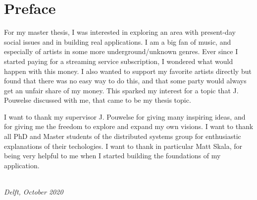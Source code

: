 \chapter*{Preface}

For my master thesis, I was interested in exploring an area with present-day social issues and in building real applications. I am a big fan of music, and especially of artists in some more underground/unknown genres. Ever since I started paying for a streaming service subscription, I wondered what would happen with this money. I also wanted to support my favorite artists directly but found that there was no easy way to do this, and that some party would always get an unfair share of my money. This sparked my interest for a topic that J. Pouwelse discussed with me, that came to be my thesis topic.

I want to thank my supervisor J. Pouwelse for giving many inspiring ideas, and for giving me the freedom to explore and expand my own visions. I want to thank all PhD and Master students of the distributed systems group for enthusiastic explanations of their techologies. I want to thank in particular Matt Skala, for being very helpful to me when I started building the foundations of my application. 

\begin{flushright}
{\makeatletter\itshape
    \@author \\
    Delft, October 2020
\makeatother}
\end{flushright}

